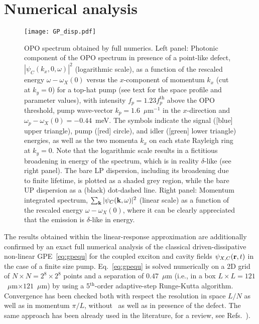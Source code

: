 \section{Numerical analysis}
\label{sec:numerical-analysis}
%
\begin{figure}[tb]\centering
\texttt{[image: GP\_disp.pdf]}
\caption{OPO spectrum obtained by full numerics. Left
  panel: Photonic component of the OPO spectrum in presence of a
  point-like defect, $|\psi_C(k_x,0,\omega)|^2$ (logarithmic scale),
  as a function of the rescaled energy $\omega - \omega_X(0)$ versus
  the $x$-component of momentum $k_x$ (cut at $k_y=0$) for a top-hat
  pump (see text for the space profile and parameter values), with
  intensity $f_p=1.23 f_p^{\text{th}}$ above the OPO threshold, pump
  wave-vector $k_p=1.6$~$\mu$m$^{-1}$ in the $x$-direction and
  $\omega_p-\omega_X(0)=-0.44$~meV. The symbols indicate the signal
  ([blue] upper triangle), pump ([red] circle), and idler ([green]
  lower triangle) energies, as well as the two momenta $k_x$ on each
  state Rayleigh ring at $k_y=0$. Note that the logarithmic scale
  results in a fictitious broadening in energy of the spectrum, which
  is in reality $\delta$-like (see right panel). The bare LP
  dispersion, including its broadening due to finite lifetime, is
  plotted as a shaded grey region, while the bare UP dispersion as a
  (black) dot-dashed line. Right panel: Momentum integrated spectrum,
  $\sum_{\mathbf{k}} |\psi_C(\mathbf{k},\omega)|^2$ (linear scale) as a
  function of the rescaled energy $\omega - \omega_X(0)$, where it can
  be clearly appreciated that the emission is $\delta$-like in
  energy.}
\label{fig:spectGP}
\end{figure}
%
The results obtained within the linear-response approximation are
additionally confirmed by an exact full numerical analysis of the
classical driven-dissipative non-linear GPE~\eqref{eq:gpequ} for the
coupled exciton and cavity fields $\psi_{X,C} (\mathbf{r},t)$ in the case
of a finite size pump. Eq.~\eqref{eq:gpequ} is solved numerically on a
2D grid of $N\times N=2^8\times 2^8$ points and a separation of
$0.47$~$\mu$m (i.e., in a box $L\times L =
121$~$\mu$m$\times 121$~$\mu$m) by using a 5$^{\text{th}}$-order
adaptive-step Runge-Kutta algorithm. Convergence has been checked both
with respect the resolution in space $L/N$ as well as in momentum
$\pi/L$, without~\cite{Marchetti_2010,9783642241857} as well as in
presence of the defect.
%
The same approach has been already used in the literature, for a
review, see Refs.~\cite{Marchetti_2010,9783642241857}).


